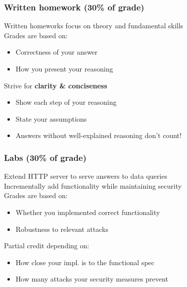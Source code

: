 \documentclass[10pt,handout]{beamer}
\begin{document}

\begin{frame}

\frametitle{Written homework (30\% of grade)}

Written homeworks focus on theory and fundamental skills
\\[1em]

Grades are based on:
\begin{itemize}
\item Correctness of your answer
\item How you present your reasoning\\[1em]
\end{itemize}

Strive for \textbf{clarity \& conciseness}
\begin{itemize}
\item Show each step of your reasoning
\item State your assumptions
\item Answers without well-explained reasoning don't count!
\end{itemize}

\end{frame}


\begin{frame}

\frametitle{Labs (30\% of grade)}

Extend HTTP server to serve answers to data queries
\\[1em]

Incrementally add functionality while maintaining security
\\[1em]

Grades are based on:
\begin{itemize}
\item Whether you implemented correct functionality
\item Robustness to relevant attacks\\[1em]
\end{itemize}

Partial credit depending on:
\begin{itemize}
  \item How close your impl. is to the functional spec
  \item How many attacks your security measures prevent
\end{itemize}

\end{frame}
\end{document}
